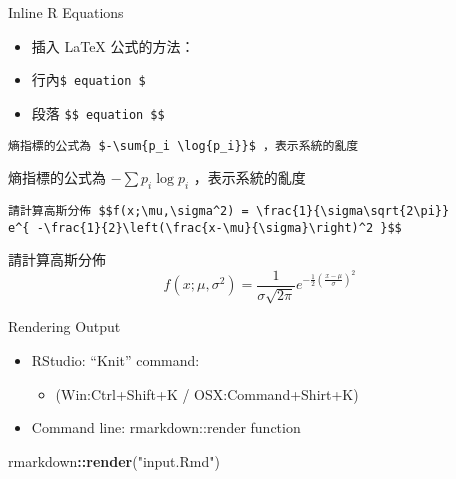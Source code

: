 \documentclass[ignorenonframetext,]{beamer}
\newenvironment{Shaded}{\begin{snugshade}}{\end{snugshade}}
\newcommand{\KeywordTok}[1]{\textcolor[rgb]{0.13,0.29,0.53}{\textbf{#1}}}
\newcommand{\StringTok}[1]{\textcolor[rgb]{0.31,0.60,0.02}{#1}}
\newcommand{\OperatorTok}[1]{\textcolor[rgb]{0.81,0.36,0.00}{\textbf{#1}}}
\newcommand{\NormalTok}[1]{#1}
\providecommand{\tightlist}{%
  \setlength{\itemsep}{0pt}\setlength{\parskip}{0pt}}
\begin{document}
\begin{frame}[fragile]{Inline R Equations}

\begin{itemize}
\tightlist
\item
  插入 LaTeX 公式的方法：\\
\item
  行內\texttt{\$\ equation\ \$}\\
\item
  段落 \texttt{\$\$\ equation\ \$\$}
\end{itemize}

\begin{verbatim}
熵指標的公式為 $-\sum{p_i \log{p_i}}$ ，表示系統的亂度  
\end{verbatim}

熵指標的公式為 \(-\sum{p_i \log{p_i}}\) ，表示系統的亂度

\begin{verbatim}
請計算高斯分佈 $$f(x;\mu,\sigma^2) = \frac{1}{\sigma\sqrt{2\pi}} 
e^{ -\frac{1}{2}\left(\frac{x-\mu}{\sigma}\right)^2 }$$  
\end{verbatim}

請計算高斯分佈
\[f(x;\mu,\sigma^2) = \frac{1}{\sigma\sqrt{2\pi}} e^{ -\frac{1}{2}\left(\frac{x-\mu}{\sigma}\right)^2 }\]

\end{frame}

\begin{frame}[fragile]{Rendering Output}

\begin{itemize}
\tightlist
\item
  RStudio: ``Knit'' command:

  \begin{itemize}
  \tightlist
  \item
    (Win:Ctrl+Shift+K / OSX:Command+Shirt+K)\\
  \end{itemize}
\item
  Command line: rmarkdown::render function
\end{itemize}

\begin{Shaded}
\begin{Highlighting}[]
\NormalTok{rmarkdown}\OperatorTok{::}\KeywordTok{render}\NormalTok{(}\StringTok{"input.Rmd"}\NormalTok{)}
\end{Highlighting}
\end{Shaded}

\end{frame}
\end{document}
